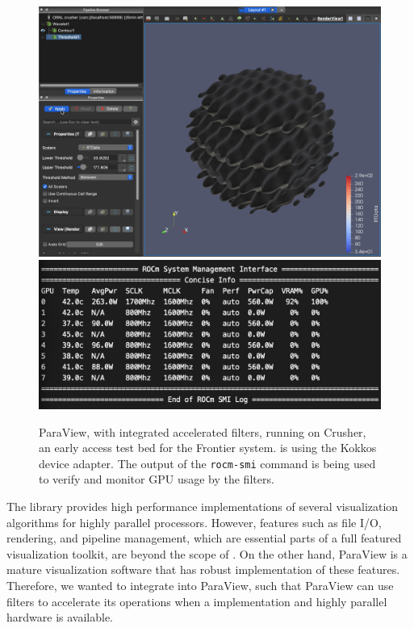\begin{figure}[htb]
  \includegraphics[width=\linewidth]{figures/paraview-crusher.png}
  \includegraphics[width=\linewidth]{figures/threshold-vtkm-gpu-usage-crusher-small.png}
  \caption{
    ParaView, with integrated \vtkm accelerated filters, running on Crusher, an early access test bed for the Frontier system.
    \vtkm is using the Kokkos device adapter.
    The output of the \texttt{rocm-smi} command is being used to verify and monitor GPU usage by the filters.
  }
  \label{fig:paraview-crusher}
\end{figure}

The \vtkm library provides high performance implementations of several visualization algorithms for highly parallel processors.
However, features such as file I/O, rendering, and pipeline management, which are essential parts of a full featured visualization toolkit, are beyond the scope of \vtkm.
On the other hand, ParaView is a mature visualization software that has robust implementation of these features.
Therefore, we wanted to integrate \vtkm into ParaView, such that ParaView can use \vtkm filters to accelerate its operations when a \vtkm implementation and highly parallel hardware is available.

